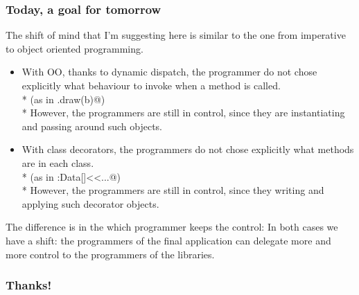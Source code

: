 \begin{frame}[fragile]
\frametitle{Today, a goal for tomorrow}
The shift of mind that I'm suggesting here is similar to the one from imperative to object oriented programming.
\begin{itemize}
\item With OO, thanks to dynamic dispatch, the programmer do not chose explicitly what behaviour to invoke when a method is called.\\*
(as in \Q@a.draw(b)@)\\*
However, the programmers are still in control, since they are instantiating and passing around such objects.
\item With class decorators, the programmers do not chose explicitly what methods are in each class.\\*
(as in \Q@Person:Data[]<<...@)\\*
However, the programmers are still in control, since they writing and applying such decorator objects.
\end{itemize}
The difference is in the which programmer keeps the control:
In both cases we have a shift: the programmers of the final application can delegate more and more control to the programmers of the libraries.
\end{frame}

%
%
% 
%
%




\begin{frame}[fragile]
\frametitle{ Thanks! }
\end{frame}

